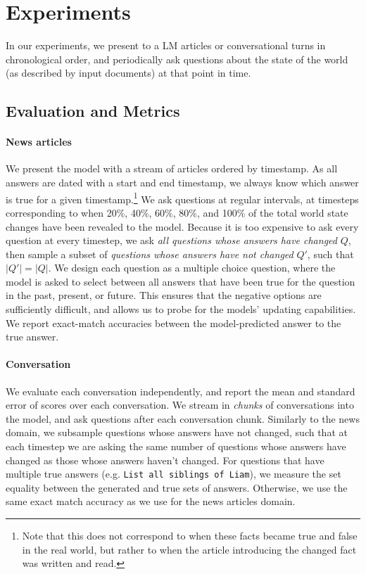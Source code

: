 \documentclass[11pt]{article}
\begin{document}
\section{Experiments}
\label{s:experiments}

In our experiments, we present to a LM articles or conversational turns in chronological order, and periodically ask questions about the state of the world (as described by input documents) at that point in time.

\subsection{Evaluation and Metrics}
\paragraph{News articles}
We present the model with a stream of articles
ordered by timestamp. As all answers are dated with a start and end timestamp, we always know which answer is true for a given timestamp.\footnote{Note that this does not correspond to when these facts became true and false in the real world, but rather to when the article introducing the changed fact was written and read.}
We ask questions at regular intervals, at timesteps corresponding to when 20\%, 40\%, 60\%, 80\%, and 100\% of the total world state changes have been revealed to the model.
Because it is too expensive to ask every question at every timestep, we ask \textit{all questions whose answers have changed} $Q$, then sample a subset of \textit{questions whose answers have not changed} $Q'$, such that $|Q'| = |Q|$.
We design each question as a multiple choice question, where the model is asked to select between all answers that have been true for the question in the past, present, or future.
This ensures that the negative options are sufficiently difficult, and allows us to probe for the models' updating capabilities.
We report exact-match accuracies between the model-predicted answer to the true answer.

\paragraph{Conversation} We evaluate each conversation independently, and report the mean and standard error of scores over each conversation.
We stream in \textit{chunks} of conversations into the model, and 
ask questions after each conversation chunk. Similarly to the news domain, we subsample questions whose answers have not changed, such that at each timestep we are asking the same number of questions whose answers have changed as those whose answers haven't changed. 
For questions that have multiple true answers (e.g. \texttt{List all siblings of Liam}), we measure the set equality between the generated and true sets of answers.
Otherwise, we use the same exact match accuracy as we use for the news articles domain.
\end{document}
